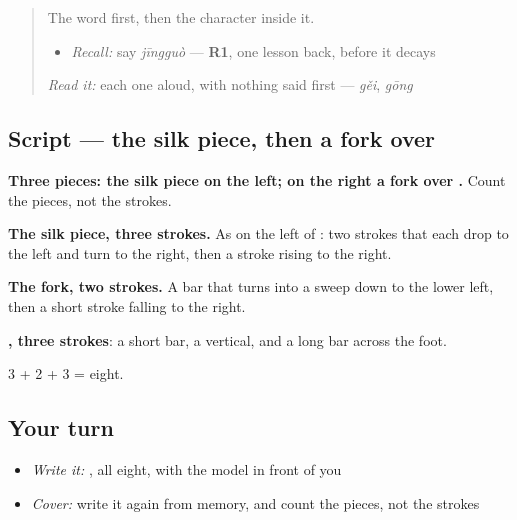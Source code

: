 \begin{quote}
The word first, then the character inside it.

\begin{itemize}
\raggedright
  \item \emph{Recall:} say \emph{jīngguò} — \textbf{R1}, one lesson back, before it decays
\end{itemize}

\begin{quote}
 
\end{quote}

\emph{Read it:} each one aloud, with nothing said first — \emph{gěi}, \emph{gōng}
\end{quote}

\subsection*{Script — the silk piece, then a fork over }

\begin{quote}
\end{quote}

\textbf{Three pieces: the silk piece on the left; on the right a fork over .} Count the pieces, not the strokes.

\textbf{The silk piece, three strokes.} As on the left of : two strokes that each drop to the left and turn to the right, then a stroke rising to the right.

\textbf{The fork, two strokes.} A bar that turns into a sweep down to the lower left, then a short stroke falling to the right.

\textbf{, three strokes}: a short bar, a vertical, and a long bar across the foot.

3 + 2 + 3 = eight.

\subsection*{Your turn}
\begin{itemize}
\raggedright
  \item \emph{Write it:} , all eight, with the model in front of you
  \item \emph{Cover:} write it again from memory, and count the pieces, not the strokes
\end{itemize}

